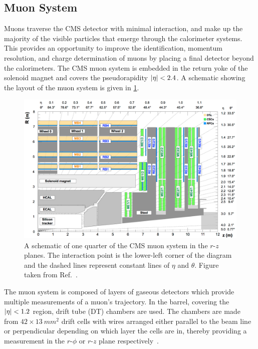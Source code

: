 \subsection{Muon System}
Muons traverse the CMS detector with minimal interaction, and make up the majority of the visible particles that emerge through the calorimeter systems. This provides an opportunity to improve the identification, momentum resolution, and charge determination of muons by placing a final detector beyond the calorimeters. The CMS muon system is embedded in the return yoke of the solenoid magnet and covers the pseudorapidity $\lvert \eta \rvert<2.4$. A schematic showing the layout of the muon system is given in \cref{fig:muon_system}.

\begin{figure}
  \centering
  \includegraphics[width=\textwidth]{Figures/Detector/CMS/muon.pdf}
  \caption[The CMS Muon System]{A schematic of one quarter of the CMS muon system in the $r$-$z$ planes. The interaction point is the lower-left corner of the diagram and the dashed lines represent constant lines of $\eta$ and $\theta$. Figure taken from Ref.~\cite{CMS:2018rym}.}\label{fig:muon_system}
\end{figure}

The muon system is composed of layers of gaseous detectors which provide multiple measurements of a muon's trajectory. In the barrel, covering the $\lvert \eta \rvert<1.2$ region, drift tube (DT) chambers are used. The chambers are made from $42 \times 13~\unit{mm^2}$ drift cells with wires arranged either parallel to the beam line or perpendicular depending on which layer the cells are in, thereby providing a measurement in the $r$-$\phi$ or $r$-$z$ plane respectively~\cite{CMS:2013vyz}.

